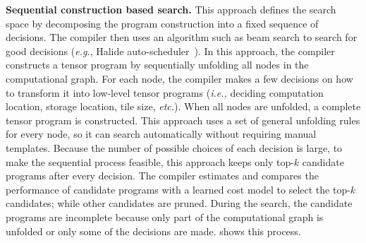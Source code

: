 \textbf{Sequential construction based search.} This approach defines the search space by decomposing the program construction into a fixed sequence of decisions.  The compiler then uses an algorithm such as beam search \cite{medress1977speech} to search for good decisions (\textit{e.g.}, Halide auto-scheduler~\cite{adams2019learning}). 
In this approach, the compiler constructs a tensor program by sequentially unfolding all nodes in the computational graph. 
For each node, the compiler makes a few decisions on how to transform it into low-level tensor programs (\textit{i.e.,} deciding computation location, storage location, tile size, \textit{etc.}).
When all nodes are unfolded, a complete tensor program is constructed.
This approach uses a set of general unfolding rules for every node, so it can search automatically without requiring manual templates.
Because the number of possible choices of each decision is large, to make the sequential process feasible, this approach keeps only top-$k$ candidate programs after every decision.
The compiler estimates and compares the performance of candidate programs with a learned cost model to select the top-$k$ candidates; while other candidates are pruned. 
During the search, the candidate programs are incomplete because only part of the computational graph is unfolded or only some of the decisions are made.
 shows this process.

